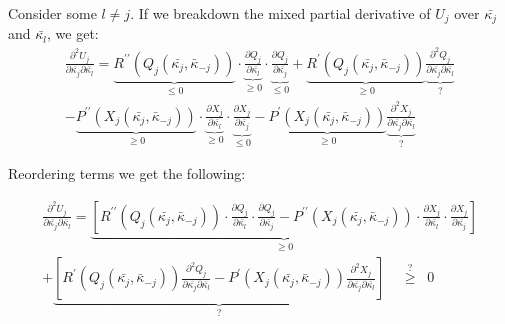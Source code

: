 \documentclass{article}
\begin{document}
Consider some $l \neq j$. If we breakdown the mixed partial derivative of $U_j$ over $\bar{\kappa_j}$ and $\bar{\kappa_l}$, we get:
\begin{align*}
\frac{\partial^2 U_{j}}{\partial\bar{\kappa_{j}} \partial\bar{\kappa_{l}}}  = 
\underbrace{R^{\prime \prime}(Q_j(\bar{\kappa_j}, \bar{\kappa}_{-j}))}_{\leq 0}
\cdot \underbrace{\frac{\partial Q_{j}}{\partial\bar{\kappa_{l}}}}_{\geq 0}
\cdot \underbrace{\frac{\partial Q_{j}}{\partial\bar{\kappa_{j}}}}_{\leq 0}  + 
\underbrace{R^{\prime} (Q_j(\bar{\kappa_j}, \bar{\kappa}_{-j}))}_{\geq 0} \underbrace{\frac{\partial^2 Q_{j}}{{\partial\bar{\kappa_{j}} \partial\bar{\kappa_{l}}}}}_{?} \\
 - \underbrace{P^{\prime \prime} (X_j(\bar{\kappa_j}, \bar{\kappa}_{-j}))}_{\geq 0}
\cdot \underbrace{\frac{\partial X_{j}}{\partial\bar{\kappa_{l}}}}_{\geq 0}
\cdot \underbrace{\frac{\partial X_{j}}{\partial\bar{\kappa_{j}}}}_{\leq 0}  - 
\underbrace{P^{\prime} (X_j(\bar{\kappa_j}, \bar{\kappa}_{-j}))}_{\geq 0} \underbrace{\frac{\partial^2 X_{j}}{\partial\bar{\kappa_{j}} \partial\bar{\kappa_{l}}}}_{?}
\tag{A}
\label{eq:mixed}
\end{align*}

Reordering terms we get the following:


\begin{align*}
    \frac{\partial^2 U_{j}}{\partial\bar{\kappa_{j}} \partial\bar{\kappa_{l}}}  = 
    \underbrace{[{R^{\prime \prime}} (Q_j(\bar{\kappa_j}, \bar{\kappa}_{-j}))
    \cdot \frac{\partial Q_{j}}{\partial\bar{\kappa_{l}}}
    \cdot \frac{\partial Q_{j}}{\partial\bar{\kappa_{j}}}  -
    P^{\prime \prime} (X_j(\bar{\kappa_j}, \bar{\kappa}_{-j}))
    \cdot \frac{\partial X_{j}}{\partial\bar{\kappa_{l}}}
    \cdot \frac{\partial X_{j}}{\partial\bar{\kappa_{j}}}]}_{\geq 0}
   \\
   + \underbrace{[R^{\prime} (Q_j(\bar{\kappa_j}, \bar{\kappa}_{-j})) \frac{\partial^2 Q_{j}}{\partial\bar{\kappa_{j}} \partial\bar{\kappa_{l}}} - 
    P^{\prime} (X_j(\bar{\kappa_j}, \bar{\kappa}_{-j})) \frac{\partial^2 X_{j}}{\partial\bar{\kappa_{j}} \partial\bar{\kappa_{l}}}]}_{?} \; \; \; \; \overset{?}{\geq} \; \; 0
\end{align*}
\end{document}
